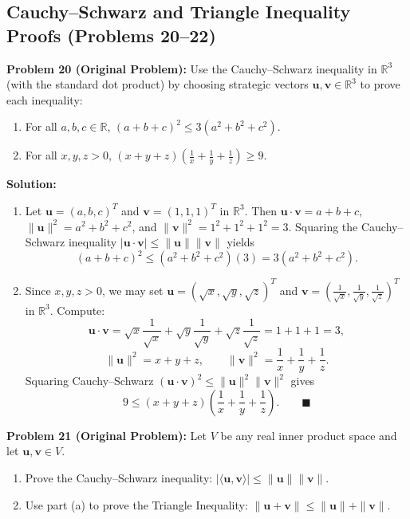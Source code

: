 \documentclass[11pt, letterpaper]{article}
\theoremstyle{definition}
\theoremstyle{remark}
\begin{document}
\subsection{Cauchy--Schwarz and Triangle Inequality Proofs (Problems 20--22)}

\textbf{Problem 20 (Original Problem):} Use the Cauchy--Schwarz inequality in $\mathbb{R}^3$ (with the standard dot product) by choosing strategic vectors $\mathbf{u}, \mathbf{v} \in \mathbb{R}^3$ to prove each inequality:
\begin{enumerate}[label=(\alph*)]
    \item For all $a, b, c \in \mathbb{R}$, $(a + b + c)^2 \le 3(a^2 + b^2 + c^2)$.
    \item For all $x, y, z > 0$, $(x + y + z)\left(\frac{1}{x} + \frac{1}{y} + \frac{1}{z}\right) \ge 9$.
\end{enumerate}

\textbf{Solution:}
\begin{enumerate}[label=(\alph*)]
    \item Let $\mathbf{u} = (a, b, c)^T$ and $\mathbf{v} = (1, 1, 1)^T$ in $\mathbb{R}^3$. Then $\mathbf{u} \cdot \mathbf{v} = a + b + c$, $\|\mathbf{u}\|^2 = a^2 + b^2 + c^2$, and $\|\mathbf{v}\|^2 = 1^2 + 1^2 + 1^2 = 3$. Squaring the Cauchy--Schwarz inequality $|\mathbf{u} \cdot \mathbf{v}| \le \|\mathbf{u}\|\|\mathbf{v}\|$ yields
    \[
    (a + b + c)^2 \le (a^2 + b^2 + c^2)(3) = 3(a^2 + b^2 + c^2).
    \]
    \item Since $x, y, z > 0$, we may set $\mathbf{u} = \left(\sqrt{x}, \sqrt{y}, \sqrt{z}\right)^T$ and $\mathbf{v} = \left(\frac{1}{\sqrt{x}}, \frac{1}{\sqrt{y}}, \frac{1}{\sqrt{z}}\right)^T$ in $\mathbb{R}^3$. Compute:
    \[
    \mathbf{u} \cdot \mathbf{v} = \sqrt{x}\frac{1}{\sqrt{x}} + \sqrt{y}\frac{1}{\sqrt{y}} + \sqrt{z}\frac{1}{\sqrt{z}} = 1 + 1 + 1 = 3,
    \]
    \[
    \|\mathbf{u}\|^2 = x + y + z, \qquad \|\mathbf{v}\|^2 = \frac{1}{x} + \frac{1}{y} + \frac{1}{z}.
    \]
    Squaring Cauchy--Schwarz $(\mathbf{u} \cdot \mathbf{v})^2 \le \|\mathbf{u}\|^2 \|\mathbf{v}\|^2$ gives
    \[
    9 \le (x + y + z)\left(\frac{1}{x} + \frac{1}{y} + \frac{1}{z}\right). \qquad \blacksquare
    \]
\end{enumerate}

\medskip

\textbf{Problem 21 (Original Problem):} Let $V$ be any real inner product space and let $\mathbf{u}, \mathbf{v} \in V$.
\begin{enumerate}[label=(\alph*)]
    \item Prove the Cauchy--Schwarz inequality: $|\langle \mathbf{u}, \mathbf{v} \rangle| \le \|\mathbf{u}\|\|\mathbf{v}\|$.
    \item Use part (a) to prove the Triangle Inequality: $\|\mathbf{u} + \mathbf{v}\| \le \|\mathbf{u}\| + \|\mathbf{v}\|$.
\end{enumerate}
\end{document}
